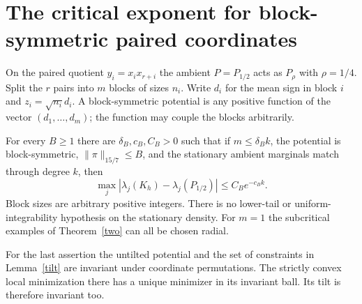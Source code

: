 \section{The critical exponent for block-symmetric paired coordinates}
\label{sec:critical}
On the paired quotient $y_i=x_ix_{r+i}$ the ambient $P=P_{1/2}$ acts as $P_\rho$ with $\rho=1/4$. Split the $r$ pairs into $m$ blocks of sizes $n_i$. Write $d_i$ for the mean sign in block $i$ and $z_i=\sqrt{n_i}d_i$. A block-symmetric potential is any positive function of the vector $(d_1,\ldots,d_m)$; the function may couple the blocks arbitrarily.

\begin{theorem}\label{critical}
For every $B\ge1$ there are $\delta_B,c_B,C_B>0$ such that if $m\le\delta_B k$, the potential is block-symmetric, $\|\pi\|_{15/7}\le B$, and the stationary ambient marginals match through degree $k$, then
\[
 \max_j|\lambda_j(K_h)-\lambda_j(P_{1/2})|\le C_B e^{-c_B k}.
\]
Block sizes are arbitrary positive integers. There is no lower-tail or uniform-integrability hypothesis on the stationary density. For $m=1$ the subcritical examples of Theorem~\ref{two} can all be chosen radial.
\end{theorem}
For the last assertion the untilted potential and the set of constraints in Lemma~\ref{tilt} are invariant under coordinate permutations. The strictly convex local minimization there has a unique minimizer in its invariant ball. Its tilt is therefore invariant too.

